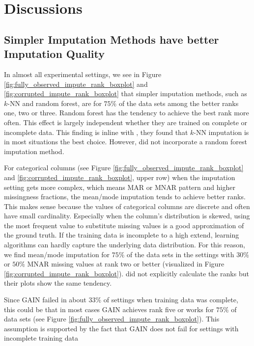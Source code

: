 

\section{Discussions}


\subsection{Simpler Imputation Methods have better Imputation Quality}
%
In almost all experimental settings, we see in Figure \ref{fig:fully_observed_impute_rank_boxplot} and \ref{fig:corrupted_impute_rank_boxplot} that simpler imputation methods, such as $k$-NN and random forest, are for $75\%$ of the data sets among the better ranks one, two or three. Random forest has the tendency to achieve the best rank more often. This effect is largely independent whether they are trained on complete or incomplete data.
This finding is inline with \cite{Imputation_Benchmark_3, Imputation_Benchmark_2, Imputation_Benchmark_4}, they found that $k$-NN imputation is in most situations the best choice. However, \cite{Imputation_Benchmark_2, Imputation_Benchmark_4} did not incorporate a random forest imputation method.

For categorical columns (see Figure \ref{fig:fully_observed_impute_rank_boxplot} and \ref{fig:corrupted_impute_rank_boxplot}, upper row) when the imputation setting gets more complex, which means MAR or MNAR pattern and higher missingness fractions, the mean/mode imputation tends to achieve better ranks. This makes sense because the values of categorical columns are discrete and often have small cardinality. Especially when the column's distribution is skewed, using the most frequent value to substitute missing values is a good approximation of the ground truth. If the training data is incomplete to a high extend, learning algorithms can hardly capture the underlying data distribution. For this reason, we find mean/mode imputation for $75\%$ of the data sets in the settings with $30\%$ or $50\%$ MNAR missing values at rank two or better (visualized in Figure \ref{fig:corrupted_impute_rank_boxplot}). \cite{Imputation_Benchmark_3} did not explicitly calculate the ranks but their plots show the same tendency.

Since GAIN failed in about $33\%$ of settings when training data was complete, this could be that in most cases GAIN achieves rank five or works for $75\%$ of data sets (see Figure \ref{fig:fully_observed_impute_rank_boxplot}). This assumption is supported by the fact that GAIN does not fail for settings with incomplete training data

